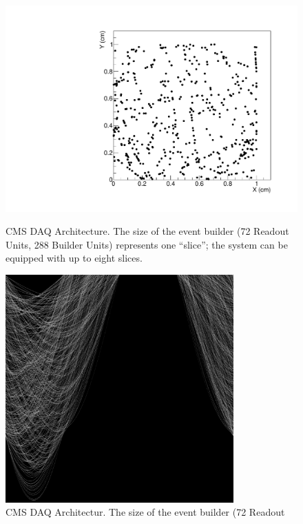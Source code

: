 \documentclass{JINST}
\begin{document}
\begin{figure}[!Hhtb]
\begin{minipage}[t]{4.0cm}
\begin{center}
	\includegraphics[width=1.\textwidth]{figs/50events_hits.pdf}
	\caption{CMS DAQ Architecture. The size  of the event builder (72 Readout
Units, 288  Builder Units) represents one “slice”; the  system can be equipped
with up to eight slices. \label{fig:hltarc}}
	\end{center}
\end{minipage}
\begin{minipage}[t]{4.0cm}
\begin{center}
	\includegraphics[width=0.78\textwidth]{figs/50events_accumulator.pdf}
	\caption{CMS DAQ Architectur. The size  of the event builder (72 Readout
}
\end{center}
\end{minipage}
\end{figure}
\end{document}
